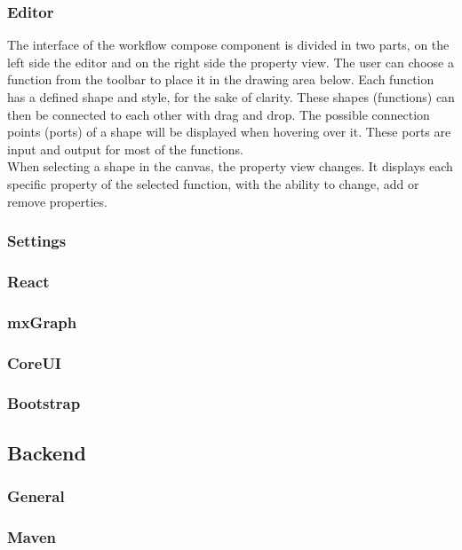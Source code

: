 \documentclass[a4paper,11pt,pdftex,halfparskip,cleardoubleempty]{scrbook}
\begin{document}
\subsubsection{Editor}

The interface of the workflow compose component is divided in two parts, on the left side the editor and on the right side the property view. The user can choose a function from the toolbar to place it in the drawing area below. Each function has a defined shape and style, for the sake of clarity. These shapes (functions) can then be connected to each other with drag and drop. The possible connection points (ports) of a shape will be displayed when hovering over it. These ports are input and output for most of the functions.\\
When selecting a shape in the canvas, the property view changes. It displays each specific property of the selected function, with the ability to change, add or remove properties.


\subsubsection{Settings}


\subsubsection{React}
\subsubsection{mxGraph}
\subsubsection{CoreUI}
\subsubsection{Bootstrap}


\subsection{Backend}

\subsubsection{General}
\subsubsection{Maven}
\end{document}
